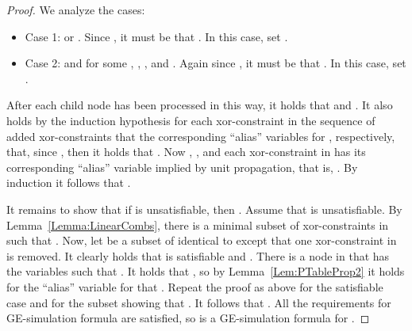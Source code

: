 \begin{proof}
We analyze the cases:
\begin{itemize}
\item[] Case 1: 
or . Since , it must be that . In this case, set .
\item[] Case 2:  and  for some ,
, , and . Again since , it must be that . In this case, set .
\end{itemize} 

After each child node has been processed in this way, it holds that  and .
It also holds by the induction hypothesis for each xor-constraint  in the
sequence  of
added xor-constraints that the corresponding ``alias'' variables  for , respectively, that,
      since , then it holds
      that . 
Now , ,
and each xor-constraint  in  has its corresponding ``alias'' variable  implied by unit propagation, that is, .
By induction it follows that .

It remains to show that if  is unsatisfiable,
then . Assume that 
 is unsatisfiable. 
By Lemma~\ref{Lemma:LinearCombs}, there is a minimal subset  of
xor-constraints in 
such that . 
Now, let 
be a subset of  identical to  except that one xor-constraint  in  is removed.
It clearly holds that  is satisfiable and . 
There is a node in  that has the variables  such that .
It holds that , so by Lemma~\ref{Lem:PTableProp2} it holds for the ``alias'' variable  for  that 
.
Repeat the proof as above for the satisfiable case and for the subset  showing
that .
It follows that .
All the requirements for GE-simulation formula are satisfied, so 
 is a GE-simulation formula for .
\end{proof}


